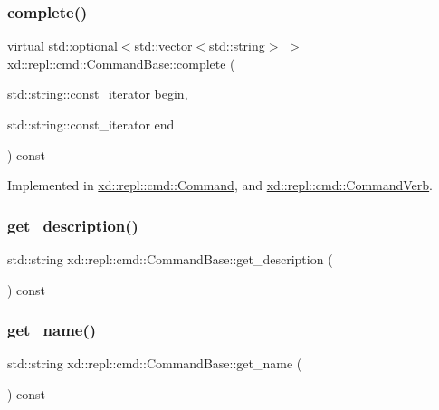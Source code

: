 \subsubsection{\texorpdfstring{complete()}{complete()}}
{\footnotesize\ttfamily virtual std\+::optional$<$std\+::vector$<$std\+::string$>$ $>$ xd\+::repl\+::cmd\+::\+Command\+Base\+::complete (\begin{DoxyParamCaption}\item[{std\+::string\+::const\+\_\+iterator}]{begin,  }\item[{std\+::string\+::const\+\_\+iterator}]{end }\end{DoxyParamCaption}) const\hspace{0.3cm}{\ttfamily [pure virtual]}}



Implemented in \mbox{\hyperlink{classxd_1_1repl_1_1cmd_1_1_command_a5bb19b12a99fe48052c346db999942de}{xd\+::repl\+::cmd\+::\+Command}}, and \mbox{\hyperlink{classxd_1_1repl_1_1cmd_1_1_command_verb_a4e9a0a2ba602a7d7e3802822a6063dff}{xd\+::repl\+::cmd\+::\+Command\+Verb}}.

\mbox{\label{classxd_1_1repl_1_1cmd_1_1_command_base_a5f7ed2376a2c46d5ef72bbcd7609ce52}} 
\subsubsection{\texorpdfstring{get\+\_\+description()}{get\_description()}}
{\footnotesize\ttfamily std\+::string xd\+::repl\+::cmd\+::\+Command\+Base\+::get\+\_\+description (\begin{DoxyParamCaption}{ }\end{DoxyParamCaption}) const\hspace{0.3cm}{\ttfamily [inline]}}

\mbox{\label{classxd_1_1repl_1_1cmd_1_1_command_base_a50ad757813a5fce8d3eba7ece771ba78}} 
\subsubsection{\texorpdfstring{get\+\_\+name()}{get\_name()}}
{\footnotesize\ttfamily std\+::string xd\+::repl\+::cmd\+::\+Command\+Base\+::get\+\_\+name (\begin{DoxyParamCaption}{ }\end{DoxyParamCaption}) const\hspace{0.3cm}{\ttfamily [inline]}}

